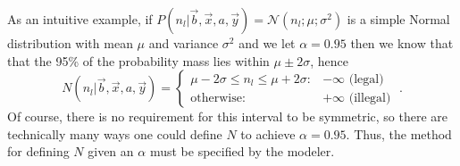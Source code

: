 \documentclass[letterpaper]{article}
\newcommand{\I}{\mathbb{I}}
\begin{document}
As an intuitive example, if 
$P(n_l| \vec{b},\vec{x},a,\vec{y}) = \mathcal{N}(n_l; \mu; \sigma^2)$
is a simple Normal distribution with mean $\mu$ and variance $\sigma^2$ and we let $\alpha = 0.95$ 
then we know that that the 95\% of the probability mass
lies within $\mu \pm 2\sigma$, hence
\begin{equation*}
N(n_l| \vec{b},\vec{x},a,\vec{y}) = 
\begin{cases}
\mu - 2\sigma \leq n_l \leq \mu + 2 \sigma: & -\infty \text{ (legal)}\\
\text{otherwise} : & +\infty \text{ (illegal)}
\end{cases} \; .
\end{equation*}
Of course, there is no requirement for this interval to be symmetric, so there
are technically many ways one could define $N$ to achieve $\alpha=0.95$.  Thus, the 
method for defining $N$ given an $\alpha$ must be specified by the modeler.

\end{document}
